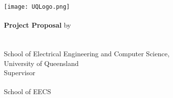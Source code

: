 \begin{titlepage}
	\begin{center}
		\texttt{[image: UQLogo.png]}\\
        \vfill
        \huge \covertext\\
        \Large \textbf{Project Proposal}
        \vfill
		\large by\\
		\vspace{5mm}
		\Large \authortext \\
        \large \studentnotext \\
        \large {}
        \vfill
		\large School of Electrical Engineering and Computer Science,\\\smallskip
        \large University of Queensland\\
        \vfill
        \small Supervisor \\
        \vspace{1mm}
        \large \supervisornametext \\
        \small School of EECS \\
        \small \mono{\supervisoremailtext} \\
        \vfill
		\large \proposalduedate
	\end{center}
\end{titlepage}

\thispagestyle{empty}
\newpage
\setcounter{page}{1}